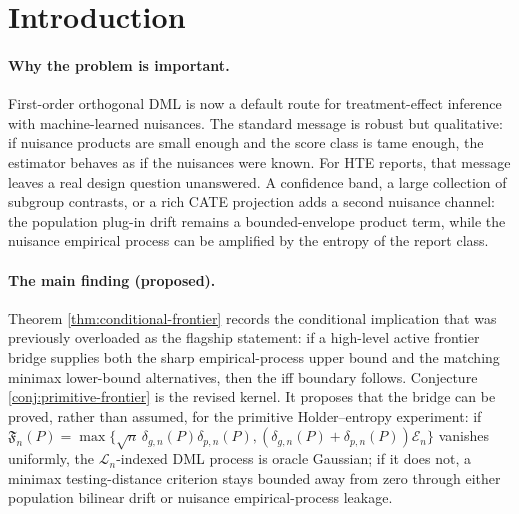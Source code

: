 \documentclass[11pt]{article}
\theoremstyle{definition}
\theoremstyle{plain}
\theoremstyle{remark}
\begin{document}
\begin{abstract}
This proposal asks for the sharp boundary at which first-order Neyman
orthogonality stops delivering uniform Gaussian inference for heterogeneous
treatment-effect DML reports.  The target is not a new adjustment formula:
under unconfoundedness the weighted CATE reports are already identified by the
usual AIPW signal.  Version 5 splits the earlier iff claim into a conditional
bookkeeping theorem, where the upper and lower frontier channels are explicitly
assumed, and a flagship primitive conjecture, where those channels must be
derived from Holder smoothness, report entropy, and minimax lower-bound
geometry.  The proposed kernel is therefore not the conditional theorem but the
claim that the two-channel scalar \(\mathfrak{F}_n(P)\) is derivable as a
necessary-and-sufficient frontier over the primitive Holder--entropy
experiment.  Resolving it would tell DML users when first-order
orthogonalization is enough and when higher-order debiasing or a weaker report
class is mathematically necessary.
\end{abstract}

\section{Introduction}
\paragraph{Why the problem is important.}
First-order orthogonal DML is now a default route for treatment-effect
inference with machine-learned nuisances.  The standard message is robust but
qualitative: if nuisance products are small enough and the score class is tame
enough, the estimator behaves as if the nuisances were known.  For HTE reports,
that message leaves a real design question unanswered.  A confidence band, a
large collection of subgroup contrasts, or a rich CATE projection adds a second
nuisance channel: the population plug-in drift remains a bounded-envelope
product term, while the nuisance empirical process can be amplified by the
entropy of the report class.

\paragraph{The main finding (proposed).}
Theorem \ref{thm:conditional-frontier} records the conditional implication that
was previously overloaded as the flagship statement: if a high-level active
frontier bridge supplies both the sharp empirical-process upper bound and the
matching minimax lower-bound alternatives, then the iff boundary follows.
Conjecture \ref{conj:primitive-frontier} is the revised kernel.  It proposes
that the bridge can be proved, rather than assumed, for the primitive
Holder--entropy experiment: if
\(\mathfrak{F}_n(P)=\max\{\sqrt n\,\delta_{g,n}(P)\delta_{p,n}(P),
(\delta_{g,n}(P)+\delta_{p,n}(P))\mathcal{E}_n\}\) vanishes uniformly, the
\(\mathcal{L}_n\)-indexed DML process is oracle Gaussian; if it does not, a
minimax testing-distance criterion stays bounded away from zero through either
population bilinear drift or nuisance empirical-process leakage.
\end{document}
